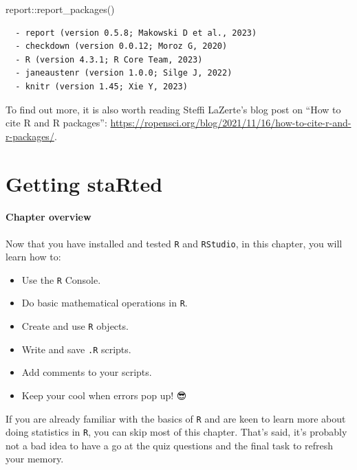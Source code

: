 \documentclass[
  letterpaper,
  DIV=11,
  numbers=noendperiod,
  oneside]{scrreprt}
\newenvironment{Shaded}{\begin{snugshade}}{\end{snugshade}}
\newcommand{\FunctionTok}[1]{\textcolor[rgb]{0.28,0.35,0.67}{#1}}
\newcommand{\NormalTok}[1]{\textcolor[rgb]{0.00,0.23,0.31}{#1}}
\newcommand{\SpecialCharTok}[1]{\textcolor[rgb]{0.37,0.37,0.37}{#1}}
\providecommand{\tightlist}{%
  \setlength{\itemsep}{0pt}\setlength{\parskip}{0pt}}\usepackage{longtable,booktabs,array}
\begin{document}
\begin{tcolorbox}
\begin{Shaded}
\begin{Highlighting}[]
\NormalTok{report}\SpecialCharTok{::}\FunctionTok{report\_packages}\NormalTok{()}
\end{Highlighting}
\end{Shaded}

\begin{verbatim}
  - report (version 0.5.8; Makowski D et al., 2023)
  - checkdown (version 0.0.12; Moroz G, 2020)
  - R (version 4.3.1; R Core Team, 2023)
  - janeaustenr (version 1.0.0; Silge J, 2022)
  - knitr (version 1.45; Xie Y, 2023)
\end{verbatim}

To find out more, it is also worth reading Steffi LaZerte's blog post on
``How to cite R and R packages'':
\url{https://ropensci.org/blog/2021/11/16/how-to-cite-r-and-r-packages/}.

\end{tcolorbox}


\chapter{Getting staRted}\label{getting-started}

\subsubsection*{\texorpdfstring{\textbf{Chapter
overview}}{Chapter overview}}\label{chapter-overview-1}

Now that you have installed and tested \texttt{R} and \texttt{RStudio},
in this chapter, you will learn how to:

\begin{itemize}
\tightlist
\item
  Use the \texttt{R} Console.
\item
  Do basic mathematical operations in \texttt{R}.
\item
  Create and use \texttt{R} objects.
\item
  Write and save \texttt{.R} scripts.
\item
  Add comments to your scripts.
\item
  Keep your cool when errors pop up! 😎
\end{itemize}

If you are already familiar with the basics of \texttt{R} and are keen
to learn more about doing statistics in \texttt{R}, you can skip most of
this chapter. That's said, it's probably not a bad idea to have a go at
the quiz questions and the final task to refresh your memory.
\end{document}
